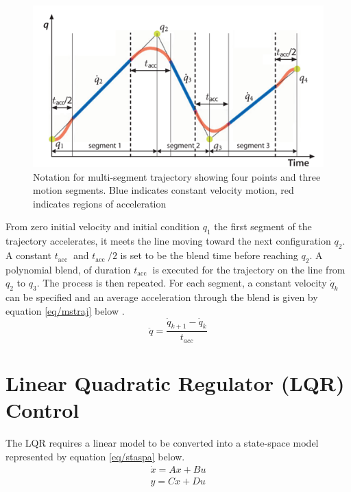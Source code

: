 \documentclass{UoNMCHA}
\numberwithin{equation}{section}
\begin{document}
	\begin{figure}[H]
		\begin{center}
			\includegraphics[width=.8\linewidth]{figs/Picture11}
			\caption{Notation for multi-segment trajectory showing four points and three motion segments. Blue indicates constant velocity motion, red indicates regions of acceleration \cite{corke_2017_robotics}}
			\label{figs/Picture11}
		\end{center}
	\end{figure}
	
	From zero initial velocity and initial condition $q_{1}$ the first segment of the trajectory accelerates, it meets
	the line moving toward the next configuration $q_{2}$. A constant $t_{\text {acc }}$ and $t_{\text {acc }} / 2$ is set to be the blend time
	before reaching $q_{2}$. A polynomial blend, of duration $t_{\text {acc }}$ is executed for the trajectory on the line from
	$q_{2}$ to $q_{3}$. The process is then repeated. For each segment, a constant velocity $\dot{q}_{k}$ can be specified and
	an average acceleration through the blend is given by equation \eqref{eq/mstraj} below \cite{corke_2017_robotics}.
\begin{equation} \label{eq/mstraj}
	\ddot{q}=\frac{\dot{q}_{k+1}-\dot{q}_{k}}{t_{a c c}}
\end{equation}
	
	\section{Linear Quadratic Regulator (LQR) Control}
	
	The LQR requires a linear model to be converted into a state-space model represented by equation \eqref{eq/staspa} below.\\
	\begin{equation}\label{eq/staspa}
\begin{array}{l}
	\dot{x}=A x+B u \\
	y=C x+D u
\end{array}
	\end{equation}\\
\end{document}
